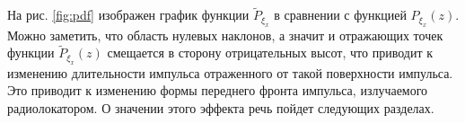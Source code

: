 На рис. \ref{fig:pdf} изображен график функции $\tilde P_{\xi_x}$ в сравнении с
функцией $P_{\xi_x}(z)$. Можно заметить, что область нулевых наклонов, а значит
и отражающих точек функции $\tilde P_{\xi_x}(z)$ смещается в сторону
отрицательных высот, что приводит к изменению длительности импульса отраженного
от такой поверхности импульса. 
Это приводит к изменению формы переднего фронта импульса, излучаемого
радиолокатором. О значении этого эффекта речь пойдет следующих разделах.

